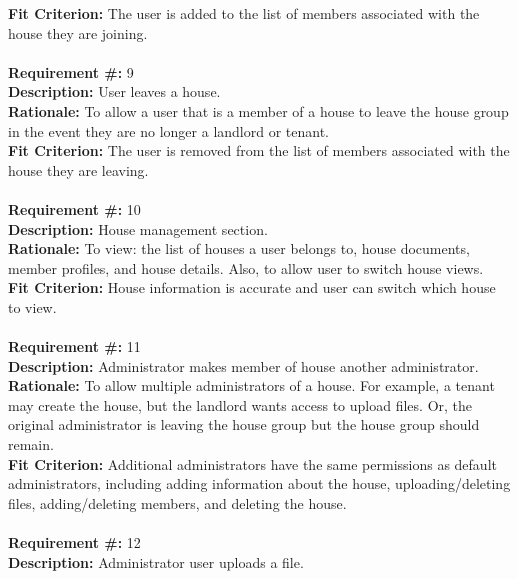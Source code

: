 \documentclass[12pt]{article}
\begin{document}
      \textbf{Fit Criterion:} The user is added to the list of members
      associated with the house they are joining. \\ \\
\textbf{Requirement \#:} 9
       \\
      \textbf{Description:} User leaves a house. \\
      \textbf{Rationale:} To allow a user that is a member of a house to leave the house group in the event they are no longer a landlord or tenant. \\
      \textbf{Fit Criterion:} The user is removed from the list of members
      associated with the house they are leaving. \\ \\
\textbf{Requirement \#:} 10
       \\
      \textbf{Description:} House management section. \\
      \textbf{Rationale:} To view: the list of houses a user belongs to, house documents, member profiles, and house details. Also, to allow user to switch house views.\\
      \textbf{Fit Criterion:} House information is accurate and user can switch which house to view. \\ \\
      \textbf{Requirement \#:} 11
       \\
      \textbf{Description:} Administrator makes member of house another administrator. \\
      \textbf{Rationale:} To allow multiple administrators of a house. For example, a tenant may create the house, but the landlord wants access to upload files. Or, the original administrator is leaving the house group but the house group should remain. \\
      \textbf{Fit Criterion:} Additional administrators have the same permissions as default administrators, including adding information about the house, uploading/deleting files, adding/deleting members, and deleting the house. \\ \\
\textbf{Requirement \#:} 12
       \\
      \textbf{Description:} Administrator user uploads a file. \\
\end{document}
